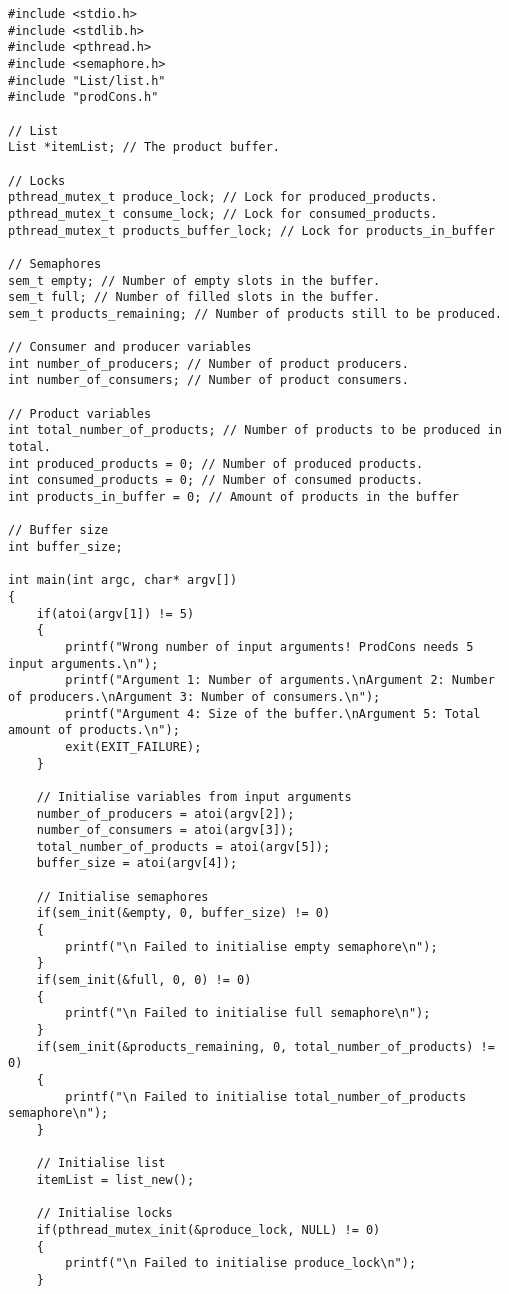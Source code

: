 \begin{lstlisting}
#include <stdio.h>
#include <stdlib.h>
#include <pthread.h>
#include <semaphore.h>
#include "List/list.h"
#include "prodCons.h"

// List
List *itemList; // The product buffer.

// Locks
pthread_mutex_t produce_lock; // Lock for produced_products.
pthread_mutex_t consume_lock; // Lock for consumed_products.
pthread_mutex_t products_buffer_lock; // Lock for products_in_buffer

// Semaphores
sem_t empty; // Number of empty slots in the buffer.
sem_t full; // Number of filled slots in the buffer.
sem_t products_remaining; // Number of products still to be produced.

// Consumer and producer variables
int number_of_producers; // Number of product producers.
int number_of_consumers; // Number of product consumers.

// Product variables
int total_number_of_products; // Number of products to be produced in total.
int produced_products = 0; // Number of produced products.
int consumed_products = 0; // Number of consumed products.
int products_in_buffer = 0; // Amount of products in the buffer

// Buffer size
int buffer_size;

int main(int argc, char* argv[])
{
	if(atoi(argv[1]) != 5)
	{
		printf("Wrong number of input arguments! ProdCons needs 5 input arguments.\n");
		printf("Argument 1: Number of arguments.\nArgument 2: Number of producers.\nArgument 3: Number of consumers.\n");
		printf("Argument 4: Size of the buffer.\nArgument 5: Total amount of products.\n");
		exit(EXIT_FAILURE);
	}

	// Initialise variables from input arguments
	number_of_producers = atoi(argv[2]);
	number_of_consumers = atoi(argv[3]);
	total_number_of_products = atoi(argv[5]);
	buffer_size = atoi(argv[4]);

	// Initialise semaphores
	if(sem_init(&empty, 0, buffer_size) != 0)
	{
		printf("\n Failed to initialise empty semaphore\n");
	}
	if(sem_init(&full, 0, 0) != 0)
	{
		printf("\n Failed to initialise full semaphore\n");
	}
	if(sem_init(&products_remaining, 0, total_number_of_products) != 0)
	{
		printf("\n Failed to initialise total_number_of_products semaphore\n");
	}

	// Initialise list
	itemList = list_new();
	
	// Initialise locks
	if(pthread_mutex_init(&produce_lock, NULL) != 0)
    {
        printf("\n Failed to initialise produce_lock\n");
    }
	

\end{lstlisting}
